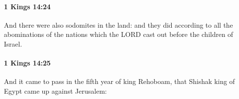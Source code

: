 		\paragraph{1 Kings 14:24} %
			\label{1KINGS-14-24}

			And there were also sodomites in the land: and they did according to all the abominations of the nations which the LORD cast out before the children of Israel.


		\paragraph{1 Kings 14:25} %
			\label{1KINGS-14-25}

			And it came to pass in the fifth year of king Rehoboam, that Shishak king of Egypt came up against Jerusalem:


